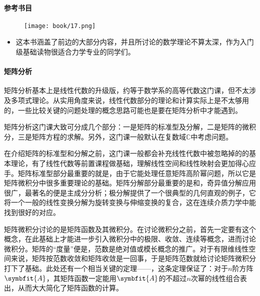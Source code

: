 \paragraph{参考书目}

\begin{figure}[h]
    \centering
    \texttt{[image: book/17.png]}
\end{figure}

\begin{itemize}
    \item \textcite[常微分方程（第四版）]{王高雄2020常微分方程}

          这本书涵盖了前边的大部分内容，并且所讨论的数学理论不算太深，作为入门级基础读物很适合力学专业的同学们。
\end{itemize}

\paragraph{矩阵分析}

矩阵分析基本上是线性代数的升级版，约等于数学系的高等代数这门课，但不太涉及多项式理论。从实用角度来说，线性代数部分的理论和计算实际上是不太够用的，一些比较关键的问题处理的概念思路可能也是要在矩阵分析中才能遇到。

矩阵分析这门课大致可分成几个部分：一是矩阵的标准型及分解，二是矩阵的微积分，三是矩阵方程的求解。另外，这门课一般默认在复数域$\mathbb{C}$中考虑问题。

在介绍矩阵的标准型和分解之前，这门课一般都会补充线性代数中被忽略掉的的基本理论，有了线性代数等前置课程做基础，理解线性空间和线性映射会更加得心应手。矩阵标准型部分最重要的就是，由于它能处理任意矩阵高阶幂问题，所以它是矩阵微积分中很多重要理论的基础。矩阵分解部分最重要的是和，奇异值分解应用很广，最著名的便是主成分分析；极分解提供了一个很典型的几何直观的例子，它将一个一般的线性变换分解为旋转变换与伸缩变换的复合，这在连续介质力学中能找到很好的对应。

矩阵微积分讨论的是矩阵函数及其微积分。在讨论微积分之前，首先一定要有这个概念，在此基础上才能进一步引入微积分中的极限、收敛、连续等概念，进而讨论微积分。矩阵的“度量”便是，范数是绝对值或模长概念的推广。对于有限维线性空间来说，矩阵按范数收敛和矩阵收敛是一回事，于是矩阵范数就给讨论矩阵微积分打下了基础。此处还有一个相当关键的定理——，这条定理保证了：对于$n$阶方阵$\symbfit{A}$，其矩阵函数一定能用$\symbfit{A}$的不超过$n$次幂的线性组合表出，从而大大简化了矩阵函数的计算。

